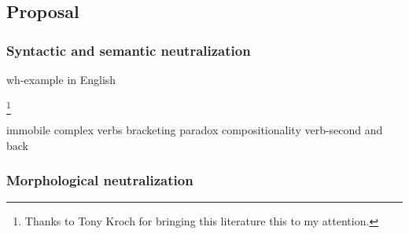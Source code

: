 \subsection{Proposal}

\citet{Downing2011}

\subsubsection{Syntactic and semantic neutralization}

\citet{Legendre2009}

wh-example in English


\footnote{Thanks to Tony Kroch for bringing this literature this to my attention.}

immobile complex verbs
bracketing paradox
compositionality
verb-second and back

\citet{Wunderlich1983}
\citet{Koopman1995}
\citet{McIntyre2002}
\citet{Dikken2003}
\citet{Muller2003}
\citet{Vikner2005}


\subsubsection{Morphological neutralization}

\citet{Anderson2010}
